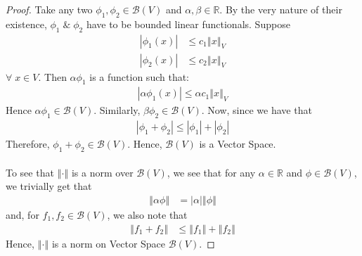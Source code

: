 \documentclass{article}
\theoremstyle{definition}
\theoremstyle{remark}
\theoremstyle{definition}
\theoremstyle{definition}
\theoremstyle{definition}
\newcommand{\abs}[1]{\left \vert #1\right \vert}
\newcommand{\norm}[1]{\left \Vert #1 \right \Vert}
\newcommand{\R}{\mathbb{R}}
\newcommand{\alg}[1]{\mathscr{#1}}
\newcommand{\sblf}[1]{\alg{B}\left (#1\right )} %
\begin{document}
\begin{proof}
	Take any two $ \phi_1,\phi_2 \in \sblf{V} $ and $ \alpha ,\beta \in \R $. By the very nature of their existence, $ \phi_1\;\&\; \phi_2 $ have to be bounded linear functionals. Suppose 
	\begin{align*}
		\abs{\phi_1(x)} &\le c_1\norm{x}_V\\
		\abs{\phi_2(x)} &\le c_2 \norm{x}_V
	\end{align*}
$ \forall\; x\in V $. Then $ \alpha \phi_1  $ is a function such that:
\begin{align*}
	\abs{\alpha\phi_1(x)} \le \alpha c_1 \norm{x}_V
\end{align*}
Hence $ \alpha \phi_1 \in \sblf{V}$. Similarly, $ \beta\phi_2 \in \sblf{V} $. Now, since we have that
\begin{align*}
	\abs{\phi_1 + \phi_2 } \le \abs{\phi_1} + \abs{\phi_2} 
\end{align*}
Therefore, $ \phi_1 + \phi_2 \in \sblf{V} $. Hence, $ \sblf{V} $ is a Vector Space.\\\\
To see that $ \norm{\cdot } $ is a norm over $ \sblf{V} $, we see that for any $ \alpha\in \R $ and $ \phi \in \sblf{V} $, we trivially get that
\begin{align*}
	\norm{\alpha\phi} &= \abs{\alpha} \norm{\phi}
\end{align*}
and, for $ f_1,f_2 \in \sblf{V} $, we also note that
\begin{align*}
	\norm{f_1 +f_2} &\le \norm{f_1} + \norm{f_2}
 \end{align*}
Hence, $ \norm{\cdot} $ is a norm on Vector Space $ \sblf{V} $.
\end{proof}
\hrulefill
\newpage
\end{document}
